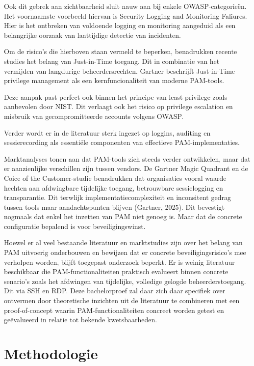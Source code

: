 Ook dit gebrek aan zichtbaarheid sluit nauw aan bij enkele OWASP-categorieën. Het voornaamste voorbeeld hiervan is Security Logging and Monitoring Faliures. Hier is het ontbreken van voldoende logging en monitoring aangeduid als een belangrijke oorzaak van laattijdige detectie van incidenten.

Om de risico's die hierboven staan vermeld te beperken, benadrukken recente studies het belang van Just-in-Time toegang. Dit in combinatie van het vermijden van langdurige beheerdersrechten. Gartner beschrijft Just-in-Time privilege management als een kernfuncionaliteit van moderne PAM-tools. 

Deze aanpak past perfect ook binnen het principe van least privilege zoals aanbevolen door NIST. Dit verlaagt ook het risico op privilege escalation en misbruik van gecompromitteerde accounts volgens OWASP.

Verder wordt er in de literatuur sterk ingezet op loggins, auditing en sessierecording als essentiële componenten van effectieve PAM-implementaties.

Marktanalyses tonen aan dat PAM-tools zich steeds verder ontwikkelen, maar dat er aanzienlijke verschillen zijn tussen vendors. De Gartner Magic Quadrant en de Coice of the Customer-studie benadrukken dat organisaties vooral waarde hechten aan afdwingbare tijdelijke toegang, betrouwbare sessielogging en transparantie. Dit terwlijk implementatiecomplexiteit en inconsitent gedrag tussen tools maar aandachtspunten blijven (Gartner, 2025). Dit bevestigt nogmaals dat enkel het inzetten van PAM niet genoeg is. Maar dat de concrete configuratie bepalend is voor beveiligingswinst.

Hoewel er al veel bestaande literatuur en marktstudies zijn over het belang van PAM uitvoerig onderbouwen en bewijzen dat er concrete beveiligingsrisico's mee verholpen worden, blijft toegepast onderzoek beperkt. Er is weinig literatuur beschikbaar die PAM-functionaliteiten praktisch evalueert binnen concrete senario's zoals het afdwingen van tijdelijke, volledige gelogde beheerderstoegang. Dit via SSH en RDP. Deze bachelorproef zal daar zich daar specifiek over ontvermen door theoretische inzichten uit de literatuur te combineren met een proof-of-concept waarin PAM-functionaliteiten concreet worden getest en geëvalueerd in relatie tot bekende kwetsbaarheden.

\section{Methodologie}%
\label{sec:methodologie}

